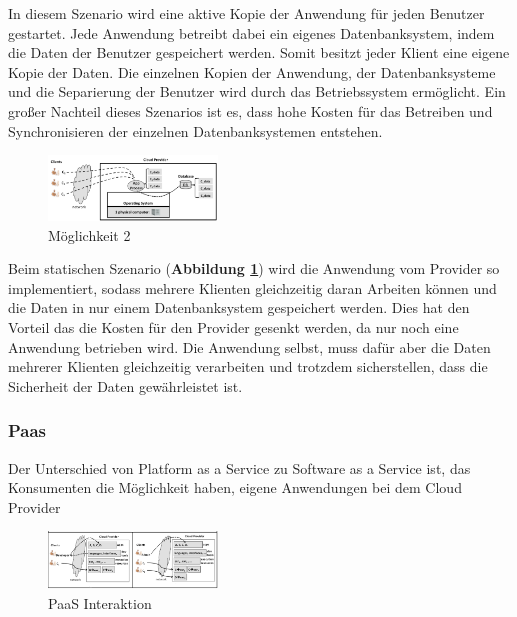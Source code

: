 In diesem Szenario wird eine aktive Kopie der Anwendung für jeden Benutzer gestartet. Jede Anwendung betreibt dabei ein eigenes Datenbanksystem, indem die Daten der Benutzer gespeichert werden.
Somit besitzt jeder Klient eine eigene Kopie der Daten. Die einzelnen Kopien der Anwendung, der Datenbanksysteme und die Separierung der Benutzer wird durch das Betriebssystem ermöglicht.
Ein großer Nachteil dieses Szenarios ist es, dass hohe Kosten für das Betreiben und Synchronisieren der einzelnen Datenbanksystemen entstehen.


\begin{figure}[H]
    \centering
	\includegraphics[width=0.4\textwidth]{Images/SaaSM2}
	\caption{Möglichkeit 2 \cite{Badger}}
	\label{SaaSM2}
\end{figure}

Beim statischen Szenario (\textbf{Abbildung \ref{SaaSM2}}) wird die Anwendung vom Provider so implementiert, sodass mehrere Klienten gleichzeitig daran Arbeiten können und die Daten in nur einem Datenbanksystem gespeichert werden. 
Dies hat den Vorteil das die Kosten für den Provider gesenkt werden, da nur noch eine Anwendung betrieben wird.
Die Anwendung selbst, muss dafür aber die Daten mehrerer Klienten gleichzeitig verarbeiten und trotzdem sicherstellen, dass die Sicherheit der Daten gewährleistet ist.   

\subsubsection{Paas}

Der Unterschied von Platform as a Service zu Software as a Service ist, das Konsumenten die Möglichkeit haben, eigene Anwendungen bei dem Cloud Provider 

\begin{figure}[H]
    \centering
	\includegraphics[width=0.4\textwidth]{Images/PaaSInteraction}
	\caption{PaaS Interaktion \cite{Badger}}
	\label{PaaSInteration}
\end{figure}

